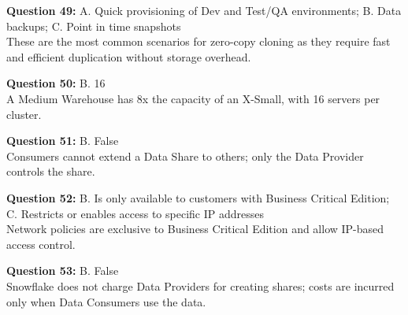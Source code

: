 \documentclass[12pt]{article}
\begin{document}
\textbf{Question 49:} A. Quick provisioning of Dev and Test/QA environments; B. Data backups; C. Point in time snapshots \\
These are the most common scenarios for zero-copy cloning as they require fast and efficient duplication without storage overhead.

\textbf{Question 50:} B. 16 \\
A Medium Warehouse has 8x the capacity of an X-Small, with 16 servers per cluster.

\textbf{Question 51:} B. False \\
Consumers cannot extend a Data Share to others; only the Data Provider controls the share.

\textbf{Question 52:} B. Is only available to customers with Business Critical Edition; C. Restricts or enables access to specific IP addresses \\
Network policies are exclusive to Business Critical Edition and allow IP-based access control.

\textbf{Question 53:} B. False \\
Snowflake does not charge Data Providers for creating shares; costs are incurred only when Data Consumers use the data.
\end{document}
